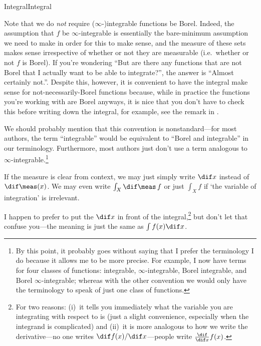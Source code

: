 \begin{dfn}{Integral}{Integral}
\begin{rmk}
\end{rmk}
\begin{rmk}
Note that we do \emph{not} require ($\infty$-)integrable functions be Borel.  Indeed, the assumption that $f$ be $\infty$-integrable is essentially the bare-minimum assumption we need to make in order for this to make sense, and the measure of these sets makes sense irrespective of whether or not they are measurable (i.e.~whether or not $f$ is Borel).  If you're wondering ``But are there any functions that are not Borel that I actually want to be able to integrate?'', the answer is ``Almost certainly not.''.  Despite this, however, it is convenient to have the integral make sense for not-necessarily-Borel functions because, while in practice the functions you're working with are Borel anyways, it is nice that you don't have to check this before writing down the integral, for example, see the remark in .
\end{rmk}
\begin{rmk}
We should probably mention that this convention is nonstandard---for most authors, the term ``integrable'' would be equivalent to ``Borel and integrable'' in our terminology.  Furthermore, most authors just don't use a term analogous to $\infty$-integrable.\footnote{By this point, it probably goes without saying that I prefer the terminology I do because it allows me to be more precise.  For example, I now have terms for four classes of functions:  integrable, $\infty$-integrable, Borel integrable, and Borel $\infty$-integrable; whereas with the other convention we would only have the terminology to speak of just one class of functions.}
\end{rmk}
\begin{rmk}
If the measure is clear from context, we may just simply write $\dif x$ instead of $\dif \meas (x)$.  We may even write $\int _X\dif \meas \, f$ or just $\int _Xf$ if `the variable of integration' is irrelevant.
\end{rmk}
\begin{rmk}
I happen to prefer to put the $\dif x$ in front of the integral,\footnote{For two reasons:  (i)~it tells you immediately what the variable you are integrating with respect to is (just a slight convenience, especially when the integrand is complicated) and (ii)~it is more analogous to how we write the derivative---no one writes $\dif f(x)/\dif x$---people write $\frac{\dif}{\dif x}f(x)$.} but don't let that confuse you---the meaning is just the same as $\int f(x)\dif x$.

\end{rmk}
\end{dfn}
